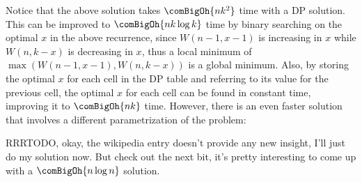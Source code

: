 
Notice that the above solution takes $\comBigOh{nk^{2}}$ time with a DP
solution. This can be improved to $\comBigOh{nk\log k}$ time by binary
searching on the optimal $x$ in the above recurrence, since $W(n-1,x-1)$ is
increasing in $x$ while $W(n,k-x)$ is decreasing in $x$, thus a local
minimum of $\max(W(n-1,x-1),W(n,k-x))$ is a global minimum.  Also, by
storing the optimal $x$ for each cell in the DP table and referring to its
value for the previous cell, the optimal $x$ for each cell can be found in
constant time, improving it to $\comBigOh{nk}$ time. However, there is an
even faster solution that involves a different parametrization of the
problem:

RRRTODO, okay, the wikipedia entry doesn't provide any new insight, I'll
just do my solution now. But check out the next bit, it's pretty interesting
to come up with a $\comBigOh{n\log n}$ solution.

%
%
%
%
%
%
%
%
%
%
%
%
%

